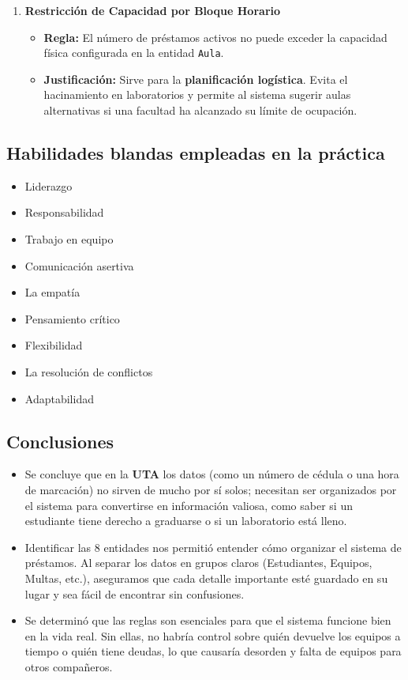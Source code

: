 \documentclass{article}
\begin{document}
\begin{enumerate}
    \item \textbf{Restricción de Capacidad por Bloque Horario}
    \begin{itemize}
        \item \textbf{Regla:} El número de préstamos activos no puede exceder la capacidad física configurada en la entidad \texttt{Aula}.
        \item \textbf{Justificación:} Sirve para la \textbf{planificación logística}. Evita el hacinamiento en laboratorios y permite al sistema sugerir aulas alternativas si una facultad ha alcanzado su límite de ocupación.
    \end{itemize}
\end{enumerate}
\subsection{Habilidades blandas empleadas en la práctica}

\begin{itemize}
    \item[$\square$]  Liderazgo
    \item[$\square$]  Responsabilidad
    \item[$\checkmark$] Trabajo en equipo
    \item[$\square$] Comunicación asertiva
    \item[$\square$] La empatía
    \item[$\square$]  Pensamiento crítico
    \item[$\square$] Flexibilidad
    \item[$\square$] La resolución de conflictos
    \item[$\square$] Adaptabilidad
\end{itemize}

\subsection{Conclusiones}
\begin{itemize}
    \item Se concluye que en la \textbf{UTA} los datos (como un número de cédula o una hora de marcación) no sirven de mucho por sí solos; necesitan ser organizados por el sistema para convertirse en información valiosa, como saber si un estudiante tiene derecho a graduarse o si un laboratorio está lleno.
    
    \item Identificar las 8 entidades nos permitió entender cómo organizar el sistema de préstamos. Al separar los datos en grupos claros (Estudiantes, Equipos, Multas, etc.), aseguramos que cada detalle importante esté guardado en su lugar y sea fácil de encontrar sin confusiones.
    
    \item Se determinó que las reglas son esenciales para que el sistema funcione bien en la vida real. Sin ellas, no habría control sobre quién devuelve los equipos a tiempo o quién tiene deudas, lo que causaría desorden y falta de equipos para otros compañeros.
\end{itemize}
\end{document}
